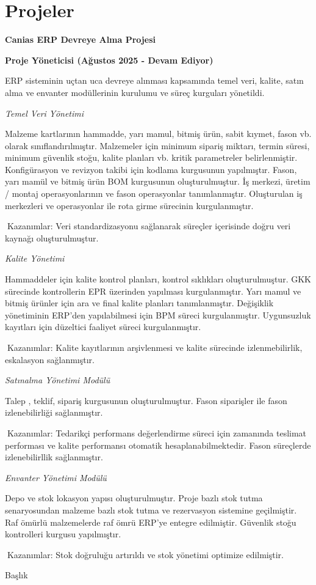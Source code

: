\documentclass[
  letterpaper,
  DIV=11,
  numbers=noendperiod]{scrartcl}
\begin{document}
\section{Projeler}\label{projeler}

\textbf{Canias ERP Devreye Alma Projesi}

\textbf{Proje Yöneticisi (Ağustos 2025 - Devam Ediyor)}

ERP sisteminin uçtan uca devreye alınması kapsamında temel veri, kalite,
satın alma ve envanter modüllerinin kurulumu ve süreç kurguları
yönetildi.

\emph{Temel Veri Yönetimi}

Malzeme kartlarının hammadde, yarı mamul, bitmiş ürün, sabit kıymet,
fason vb. olarak sınıflandırılmıştır. Malzemeler için minimum sipariş
miktarı, termin süresi, minimum güvenlik stoğu, kalite planları vb.
kritik parametreler belirlenmiştir. Konfigürasyon ve revizyon takibi
için kodlama kurgusunun yapılmıştır. Fason, yarı mamül ve bitmiş ürün
BOM kurgusunun oluşturulmuştur. İş merkezi, üretim / montaj
operasyonlarının ve fason operasyonlar tanımlanmıştır. Oluşturulan iş
merkezleri ve operasyonlar ile rota girme sürecinin kurgulanmıştır.

📍Kazanımlar: Veri standardizasyonu sağlanarak süreçler içerisinde doğru
veri kaynağı oluşturulmuştur.

\emph{Kalite Yönetimi}

Hammaddeler için kalite kontrol planları, kontrol sıklıkları
oluşturulmuştur. GKK sürecinde kontrollerin EPR üzerinden yapılması
kurgulanmıştır. Yarı mamul ve bitmiş ürünler için ara ve final kalite
planları tanımlanmıştır. Değişiklik yönetiminin ERP'den yapılabilmesi
için BPM süreci kurgulanmıştır. Uygunsuzluk kayıtları için düzeltici
faaliyet süreci kurgulanmıştır.

📍Kazanımlar: Kalite kayıtlarının arşivlenmesi ve kalite sürecinde
izlenmebilirlik, eskalasyon sağlanmıştır.

\emph{Satınalma Yönetimi Modülü}

Talep , teklif, sipariş kurgusunun oluşturulmuştur. Fason siparişler ile
fason izlenebilirliği sağlanmıştır.

📍Kazanımlar: Tedarikçi performans değerlendirme süreci için zamanında
teslimat performası ve kalite performansı otomatik hesaplanabilmektedir.
Fason süreçlerde izlenebilirllik sağlanmıştır.

\emph{Envanter Yönetimi Modülü}

Depo ve stok lokasyon yapısı oluşturulmuştır. Proje bazlı stok tutma
senaryosundan malzeme bazlı stok tutma ve rezervasyon sistemine
geçilmiştir. Raf ömürlü malzemelerde raf ömrü ERP'ye entegre edilmiştir.
Güvenlik stoğu kontrolleri kurgusu yapılmıştır.

📍Kazanımlar: Stok doğruluğu artırıldı ve stok yönetimi optimize
edilmiştir.

Başlık
\end{document}
